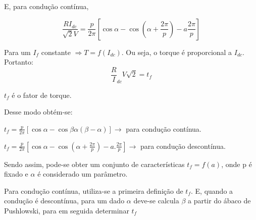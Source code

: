 E, para condução contínua,

\[\frac{RI_{dc}}{\sqrt{2}V} = \frac{p}{2\pi}\left[\cos\alpha - \cos\left(\alpha + \frac{2\pi}{p}\right) - a\frac{2\pi}{p}\right]\]

Para um $I_{f}$ constante $\Rightarrow T = f(I_{dc})$. Ou seja, o torque é proporcional a $I_{dc}$. Portanto:
\[\frac{R}I_{dc}{V\sqrt{2}} = t_{f}\]

$t_{f}$ é o fator de torque.

Desse modo obtém-se:

$t_{f} = \frac{p}{2\pi}\left[\cos{\alpha} - \cos{\beta} \alpha\left(\beta - \alpha\right)\right] \rightarrow$ para condução contínua.

$t_{f} = \frac{p}{2\pi}\left[\cos{\alpha} - \cos\left(\alpha + \frac{2\pi}{p}\right) - a.\frac{2\pi}{p} \right] \rightarrow$ para condução descontínua.

Sendo assim, pode-se obter um conjunto de características $t_{f} = f(a)$, onde p é fixado e $\alpha$ é considerado um parâmetro. 

Para condução contínua, utiliza-se a primeira definição de $t_{f}$. E, quando a condução é descontínua, para um dado $\alpha$ deve-se calcula $\beta$ a partir do ábaco de Pushlowski, para em seguida determinar $t_{f}$


